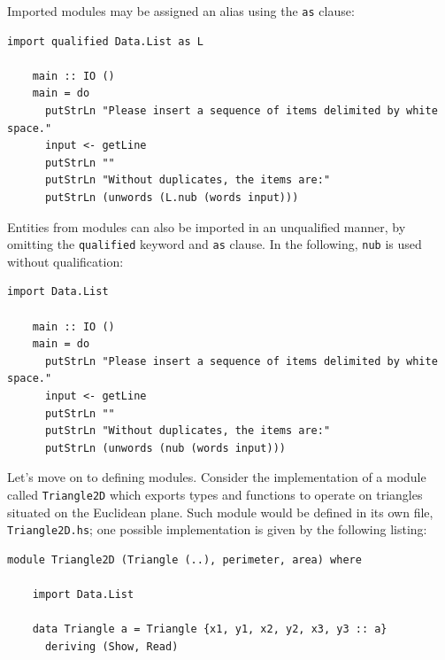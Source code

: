 \documentclass[UdineBachThesis,american,11pt]{PhdThesis}
\begin{document}
  Imported modules may be assigned an alias using the \mbox{\texttt{as}} clause:

  \begin{Verbatim}[gobble=4,fontsize=\small]
    import qualified Data.List as L

    main :: IO ()
    main = do
      putStrLn "Please insert a sequence of items delimited by white space."
      input <- getLine
      putStrLn ""
      putStrLn "Without duplicates, the items are:"
      putStrLn (unwords (L.nub (words input)))
  \end{Verbatim}

  Entities from modules can also be imported in an unqualified manner, by
  omitting the \mbox{\texttt{qualified}} keyword and \mbox{\texttt{as}} clause.
  In the following, \mbox{\texttt{nub}} is used without qualification:

  \begin{Verbatim}[gobble=4,fontsize=\small]
    import Data.List

    main :: IO ()
    main = do
      putStrLn "Please insert a sequence of items delimited by white space."
      input <- getLine
      putStrLn ""
      putStrLn "Without duplicates, the items are:"
      putStrLn (unwords (nub (words input)))
  \end{Verbatim}

  Let's move on to defining modules. Consider the implementation of a module
  called \mbox{\texttt{Triangle2D}} which exports types and functions to operate
  on triangles situated on the Euclidean plane. Such module would be defined in
  its own file, \mbox{\texttt{Triangle2D.hs}}; one possible implementation is
  given by the following listing:

  \begin{Verbatim}[gobble=4,fontsize=\small]
    module Triangle2D (Triangle (..), perimeter, area) where

    import Data.List

    data Triangle a = Triangle {x1, y1, x2, y2, x3, y3 :: a}
      deriving (Show, Read)
  \end{Verbatim}

  \pagebreak
\end{document}
